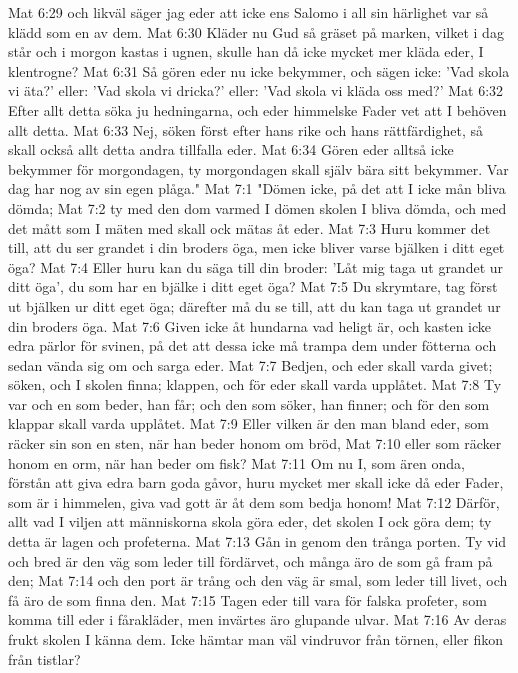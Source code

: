 Mat 6:29  och likväl säger jag eder att icke ens Salomo i all sin härlighet var så klädd som en av dem.
Mat 6:30  Kläder nu Gud så gräset på marken, vilket i dag står och i morgon kastas i ugnen, skulle han då icke mycket mer kläda eder, I klentrogne?
Mat 6:31  Så gören eder nu icke bekymmer, och sägen icke: 'Vad skola vi äta?' eller: 'Vad skola vi dricka?' eller: 'Vad skola vi kläda oss med?'
Mat 6:32  Efter allt detta söka ju hedningarna, och eder himmelske Fader vet att I behöven allt detta.
Mat 6:33  Nej, söken först efter hans rike och hans rättfärdighet, så skall också allt detta andra tillfalla eder.
Mat 6:34  Gören eder alltså icke bekymmer för morgondagen, ty morgondagen skall själv bära sitt bekymmer. Var dag har nog av sin egen plåga."
Mat 7:1  "Dömen icke, på det att I icke mån bliva dömda;
Mat 7:2  ty med den dom varmed I dömen skolen I bliva dömda, och med det mått som I mäten med skall ock mätas åt eder.
Mat 7:3  Huru kommer det till, att du ser grandet i din broders öga, men icke bliver varse bjälken i ditt eget öga?
Mat 7:4  Eller huru kan du säga till din broder: 'Låt mig taga ut grandet ur ditt öga', du som har en bjälke i ditt eget öga?
Mat 7:5  Du skrymtare, tag först ut bjälken ur ditt eget öga; därefter må du se till, att du kan taga ut grandet ur din broders öga.
Mat 7:6  Given icke åt hundarna vad heligt är, och kasten icke edra pärlor för svinen, på det att dessa icke må trampa dem under fötterna och sedan vända sig om och sarga eder.
Mat 7:7  Bedjen, och eder skall varda givet; söken, och I skolen finna; klappen, och för eder skall varda upplåtet.
Mat 7:8  Ty var och en som beder, han får; och den som söker, han finner; och för den som klappar skall varda upplåtet.
Mat 7:9  Eller vilken är den man bland eder, som räcker sin son en sten, när han beder honom om bröd,
Mat 7:10  eller som räcker honom en orm, när han beder om fisk?
Mat 7:11  Om nu I, som ären onda, förstån att giva edra barn goda gåvor, huru mycket mer skall icke då eder Fader, som är i himmelen, giva vad gott är åt dem som bedja honom!
Mat 7:12  Därför, allt vad I viljen att människorna skola göra eder, det skolen I ock göra dem; ty detta är lagen och profeterna.
Mat 7:13  Gån in genom den trånga porten. Ty vid och bred är den väg som leder till fördärvet, och många äro de som gå fram på den;
Mat 7:14  och den port är trång och den väg är smal, som leder till livet, och få äro de som finna den.
Mat 7:15  Tagen eder till vara för falska profeter, som komma till eder i fårakläder, men invärtes äro glupande ulvar.
Mat 7:16  Av deras frukt skolen I känna dem. Icke hämtar man väl vindruvor från törnen, eller fikon från tistlar?
